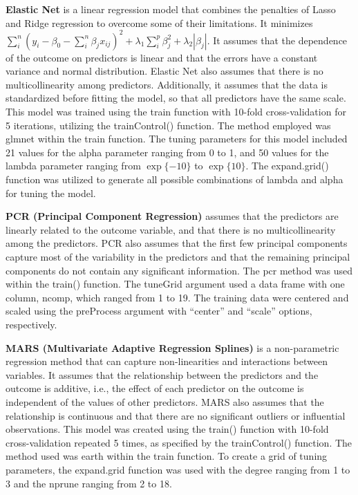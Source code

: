 \documentclass[
]{article}
\begin{document}
\textbf{Elastic Net} is a linear regression model that combines the
penalties of Lasso and Ridge regression to overcome some of their
limitations. It minimizes
\(\sum_i^n(y_i-\beta_0-\sum_i^n\beta_jx_{ij})^2+\lambda_1\sum_i^p\beta_j^2+\lambda_2|\beta_j|\).
It assumes that the dependence of the outcome on predictors is linear
and that the errors have a constant variance and normal distribution.
Elastic Net also assumes that there is no multicollinearity among
predictors. Additionally, it assumes that the data is standardized
before fitting the model, so that all predictors have the same scale.
This model was trained using the train function with 10-fold
cross-validation for 5 iterations, utilizing the trainControl()
function. The method employed was glmnet within the train function. The
tuning parameters for this model included 21 values for the alpha
parameter ranging from 0 to 1, and 50 values for the lambda parameter
ranging from \(\exp\{-10\}\) to \(\exp\{10\}\). The expand.grid()
function was utilized to generate all possible combinations of lambda
and alpha for tuning the model.

\textbf{PCR (Principal Component Regression)} assumes that the
predictors are linearly related to the outcome variable, and that there
is no multicollinearity among the predictors. PCR also assumes that the
first few principal components capture most of the variability in the
predictors and that the remaining principal components do not contain
any significant information. The pcr method was used within the train()
function. The tuneGrid argument used a data frame with one column,
ncomp, which ranged from 1 to 19. The training data were centered and
scaled using the preProcess argument with ``center'' and ``scale''
options, respectively.

\textbf{MARS (Multivariate Adaptive Regression Splines)} is a
non-parametric regression method that can capture non-linearities and
interactions between variables. It assumes that the relationship between
the predictors and the outcome is additive, i.e., the effect of each
predictor on the outcome is independent of the values of other
predictors. MARS also assumes that the relationship is continuous and
that there are no significant outliers or influential observations. This
model was created using the train() function with 10-fold
cross-validation repeated 5 times, as specified by the trainControl()
function. The method used was earth within the train function. To create
a grid of tuning parameters, the expand.grid function was used with the
degree ranging from 1 to 3 and the nprune ranging from 2 to 18.
\end{document}
